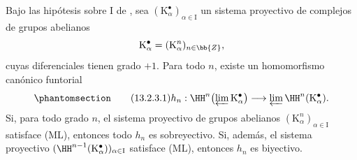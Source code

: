 \documentclass[oneside]{amsart}
\let\EGAOriginalLabel\label
\renewcommand{\label}[1]{\phantomsection\EGAOriginalLabel{#1}}
\begin{document}
\begin{proposition}[13.2.3]
\label{0.13.2.3}
Bajo las hipótesis sobre $\mathrm{I}$ de , sea
$(\mathrm{K}^\bullet_\alpha)_{\alpha\in\mathrm{I}}$ un sistema proyectivo
de complejos de grupos abelianos
\[
  \mathrm{K}^\bullet_\alpha
  =
  (\mathrm{K}^n_\alpha)_{n\in\bb{Z}},
\]
cuyas diferenciales tienen grado $+1$.
Para todo $n$, existe un homomorfismo canónico funtorial
\begin{equation}
\label{0.13.2.3.1}
\tag{13.2.3.1}
  h_n:
  \HH^n\bigl(\varprojlim\mathrm{K}^\bullet_\alpha\bigr)
  \longrightarrow
  \varprojlim\HH^n(\mathrm{K}^\bullet_\alpha).
\end{equation}
Si, para todo grado $n$, el sistema proyectivo de grupos abelianos
$(\mathrm{K}^n_\alpha)_{\alpha\in\mathrm{I}}$ satisface {\rm(ML)},
entonces todo $h_n$ es sobreyectivo.
Si, además, el sistema proyectivo
$(\HH^{n-1}(\mathrm{K}^\bullet_\alpha))_{\alpha\in\mathrm{I}}$
satisface {\rm(ML)}, entonces $h_n$ es biyectivo.
\end{proposition}
\end{document}
